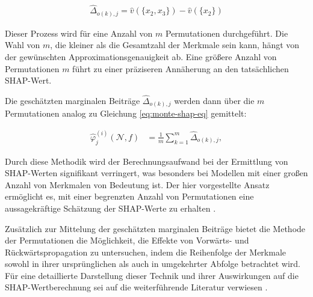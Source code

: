 \begin{align}
    \hat{\Delta}_{o(k), j} = \hat{v}(\{x_2, x_3\}) - \hat{v}(\{x_2\})
\end{align}

Dieser Prozess wird für eine Anzahl von $m$ Permutationen durchgeführt. Die Wahl von $m$,
die kleiner als die Gesamtzahl der Merkmale sein kann, hängt von der gewünschten Approximationsgenauigkeit
ab. Eine größere Anzahl von Permutationen $m$ führt zu einer präziseren Annäherung an den tatsächlichen SHAP-Wert.

Die geschätzten marginalen Beiträge $\hat{\Delta}_{o(k), j}$ werden dann über die $m$ Permutationen analog zu Gleichung
\ref{eq:monte-shap-eq} gemittelt:

\begin{align}
    \label{eq:permu-shap-eq}
    \hat{\varphi}^{(i)}_{j} (\mathcal{N}, f) &= \frac{1}{m}\sum_{k=1}^{m}\hat{\Delta}_{o(k), j},
\end{align}

Durch diese Methodik wird der Berechnungsaufwand bei der Ermittlung von SHAP-Werten 
signifikant verringert, was besonders bei Modellen mit einer großen Anzahl von Merkmalen von 
Bedeutung ist. Der hier vorgestellte Ansatz ermöglicht es, mit einer begrenzten Anzahl von 
Permutationen eine aussagekräftige Schätzung der SHAP-Werte zu erhalten \cite[S. 39]{Molnar_2023}.

Zusätzlich zur Mittelung der geschätzten marginalen Beiträge bietet die Methode der Permutationen 
die Möglichkeit, die Effekte von Vorwärts- und Rückwärtspropagation zu untersuchen, 
indem die Reihenfolge der Merkmale sowohl in ihrer ursprünglichen als auch in umgekehrter 
Abfolge betrachtet wird. Für eine detaillierte Darstellung dieser Technik und ihrer 
Auswirkungen auf die SHAP-Wertberechnung sei auf die weiterführende Literatur verwiesen \cite[S. 39f]{Molnar_2023}.


